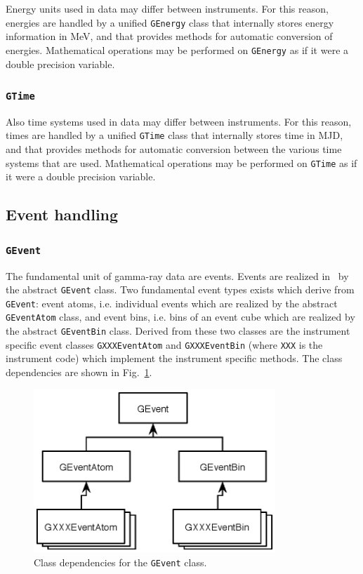 \documentclass{article}[12pt,a4]
\begin{document}
Energy units used in data may differ between instruments.
For this reason, energies are handled by a unified {\tt GEnergy} class that internally
stores energy information in MeV, and that provides methods for automatic conversion
of energies.
Mathematical operations may be performed on {\tt GEnergy} as if it were a double
precision variable.


\subsubsection{{\tt GTime}}

Also time systems used in data may differ between instruments.
For this reason, times are handled by a unified {\tt GTime} class that internally stores
time in MJD, and that provides methods for automatic conversion between the various
time systems that are used.
Mathematical operations may be performed on {\tt GTime} as if it were a double
precision variable.


\subsection{Event handling}

\subsubsection{{\tt GEvent}}

The fundamental unit of gamma-ray data are events.
Events are realized in \this\ by the abstract {\tt GEvent} class.
Two fundamental event types exists which derive from {\tt GEvent}:
event atoms, i.e. individual events which are realized by the abstract {\tt GEventAtom} class, and
event bins, i.e. bins of an event cube which are realized by the abstract {\tt GEventBin} class.
Derived from these two classes are the instrument specific event classes
{\tt GXXXEventAtom} and {\tt GXXXEventBin} (where {\tt XXX} is the instrument code)
which implement the instrument specific methods.
The class dependencies are shown in Fig.~\ref{fig:GEvent}.
%
%
\begin{figure}[!h]
\centering
\includegraphics[width=9.1cm]{GEvent.eps}
\caption{Class dependencies for the {\tt GEvent} class.}
\label{fig:GEvent}
\end{figure}
%
\end{document}
